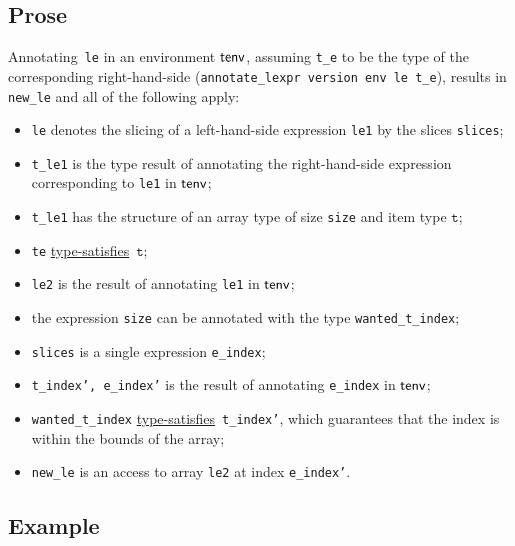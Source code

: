 \documentclass{book}
\newcommand\typesatisfies[0]{\hyperlink{def-typesatisfies}{type-satisfies}}
\newcommand\vt[0]{\texttt{t}}
\begin{document}
  \subsection{Prose}
   Annotating~\texttt{le} in an environment $\textsf{tenv}$, assuming
\texttt{t\_e} to be the type of the corresponding right-hand-side
(\texttt{annotate\_lexpr version env le t\_e}), results in \texttt{new\_le} and
all of the following apply:
   \begin{itemize}
   \item \texttt{le} denotes the slicing of a left-hand-side expression \texttt{le1} by the slices \texttt{slices};
   \item \texttt{t\_le1} is the type result of annotating the right-hand-side expression corresponding to \texttt{le1} in $\textsf{tenv}$;
   \item \texttt{t\_le1} has the structure of an array type of size \texttt{size} and item type $\vt$;
   \item \texttt{te} \typesatisfies\  $\vt$;
   \item \texttt{le2} is the result of annotating \texttt{le1} in $\textsf{tenv}$;
  \item the expression \texttt{size} can be annotated with the type \texttt{wanted\_t\_index};
  \item \texttt{slices} is a single expression \texttt{e\_index};
   \item \texttt{t\_index', e\_index'} is the result of annotating \texttt{e\_index} in $\textsf{tenv}$;
   \item \texttt{wanted\_t\_index} \typesatisfies\  \texttt{t\_index'}, which guarantees that the index
   is within the bounds of the array;
   \item \texttt{new\_le} is an access to array \texttt{le2} at index \texttt{e\_index'}.
   \end{itemize}

  \subsection{Example}
\end{document}
